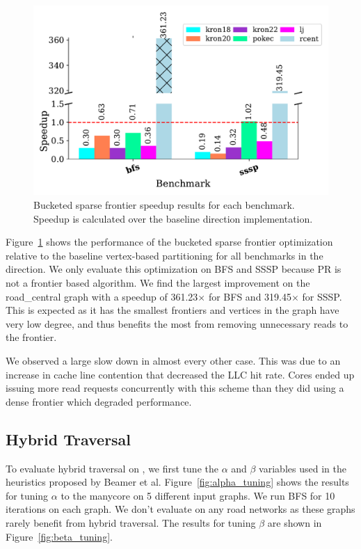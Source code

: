 \begin{figure}[h]
    \centering
    \includegraphics[scale=0.6]{graphit-figures/sparse.pdf}
    \caption{Bucketed sparse frontier speedup results for each benchmark. Speedup is calculated over the baseline \push direction implementation.} %
    \label{pap:cgo2020:sec:eval:fig:sparse}
\end{figure}

Figure~\ref{pap:cgo2020:sec:eval:fig:sparse} shows the performance of the bucketed sparse frontier optimization relative to the baseline vertex-based partitioning for all benchmarks in the \push direction.
We only evaluate this optimization on BFS and SSSP because PR is not a frontier based algorithm.
We find the largest improvement on the road\_central graph with a speedup of 361.23$\times$ for BFS and 319.45$\times$ for SSSP.
This is expected as it has the smallest frontiers and vertices in the graph have very low degree, and thus benefits the most from removing unnecessary reads to the frontier.

We observed a large slow down in almost every other case.
This was due to an increase in cache line contention that decreased the LLC hit rate. 
Cores ended up issuing more read requests concurrently with this scheme than they did using a dense frontier which degraded performance.

\subsection{Hybrid Traversal}

To evaluate hybrid traversal on \hb, we first tune the $\alpha$ and $\beta$ variables used in the heuristics proposed by Beamer et al.
\alphatune
Figure~\ref{fig:alpha_tuning} shows the results for tuning $\alpha$ to the \hb manycore on 5 different input graphs. 
We run BFS for 10 iterations on each graph.
We don't evaluate on any road networks as these graphs rarely benefit from hybrid traversal.
\betatune
The results for tuning $\beta$ are shown in Figure~\ref{fig:beta_tuning}.

